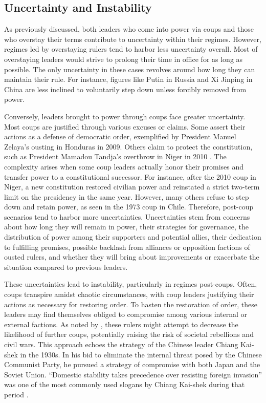 \documentclass[
  12pt,
  a4paper,
  12pt]{article}
\begin{document}
\hypertarget{uncertainty-and-instability-1}{%
\subsection{Uncertainty and
Instability}\label{uncertainty-and-instability-1}}

As previously discussed, both leaders who come into power via coups and
those who overstay their terms contribute to uncertainty within their
regimes. However, regimes led by overstaying rulers tend to harbor less
uncertainty overall. Most of overstaying leaders would strive to prolong
their time in office for as long as possible. The only uncertainty in
these cases revolves around how long they can maintain their rule. For
instance, figures like Putin in Russia and Xi Jinping in China are less
inclined to voluntarily step down unless forcibly removed from power.

Conversely, leaders brought to power through coups face greater
uncertainty. Most coups are justified through various excuses or claims.
Some assert their actions as a defense of democratic order, exemplified
by President Manuel Zelaya's ousting in Honduras in 2009. Others claim
to protect the constitution, such as President Mamadou Tandja's
overthrow in Niger in 2010 \citep{ginsburg2019}. The complexity arises
when some coup leaders actually honor their promises and transfer power
to a constitutional successor. For instance, after the 2010 coup in
Niger, a new constitution restored civilian power and reinstated a
strict two-term limit on the presidency in the same year. However, many
others refuse to step down and retain power, as seen in the 1973 coup in
Chile. Therefore, post-coup scenarios tend to harbor more uncertainties.
Uncertainties stem from concerns about how long they will remain in
power, their strategies for governance, the distribution of power among
their supporters and potential allies, their dedication to fulfilling
promises, possible backlash from alliances or opposition factions of
ousted rulers, and whether they will bring about improvements or
exacerbate the situation compared to previous leaders.

These uncertainties lead to instability, particularly in regimes
post-coups. Often, coups transpire amidst chaotic circumstances, with
coup leaders justifying their actions as necessary for restoring order.
To hasten the restoration of order, these leaders may find themselves
obliged to compromise among various internal or external factions. As
noted by \citet{roessler2011}, these rulers might attempt to decrease
the likelihood of further coups, potentially raising the risk of
societal rebellions and civil wars. This approach echoes the strategy of
the Chinese leader Chiang Kai-shek in the 1930s. In his bid to eliminate
the internal threat posed by the Chinese Communist Party, he pursued a
strategy of compromise with both Japan and the Soviet Union. ``Domestic
stability takes precedence over resisting foreign invasion'' was one of
the most commonly used slogans by Chiang Kai-shek during that period
\citep{chu1999chiang}.
\end{document}

